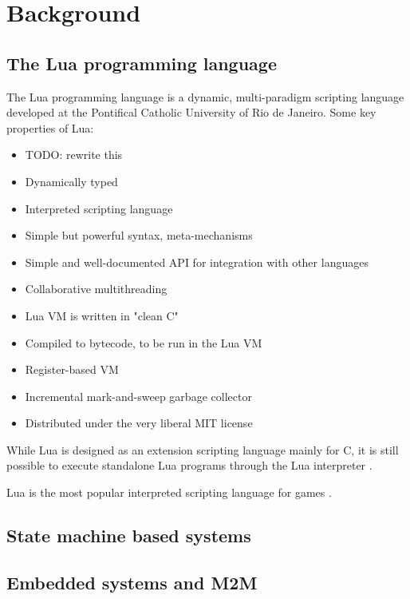 \chapter{Background}
\label{chp:background}

\section{The Lua programming language}
\label{sec:lua_language}

The Lua programming language is a dynamic, multi-paradigm scripting language developed at the Pontifical Catholic University of Rio de Janeiro. Some key properties of Lua:

\begin{itemize}
	\item TODO: rewrite this
	\item Dynamically typed
	\item Interpreted scripting language
	\item Simple but powerful syntax, meta-mechanisms
	\item Simple and well-documented API for integration with other languages
	\item Collaborative multithreading
	\item Lua VM is written in "clean C"
	\item Compiled to bytecode, to be run in the Lua VM
	\item Register-based VM
	\item Incremental mark-and-sweep garbage collector
	\item Distributed under the very liberal MIT license \cite{website:lua_license}
\end{itemize}

While Lua is designed as an extension scripting language mainly for C, it is still possible to execute standalone Lua programs through the Lua interpreter \cite[ch. 7]{book:lua_reference_manual}.

Lua is the most popular interpreted scripting language for games \cite{website:the_engine_survey}.

\section{State machine based systems}


\section{Embedded systems and M2M}